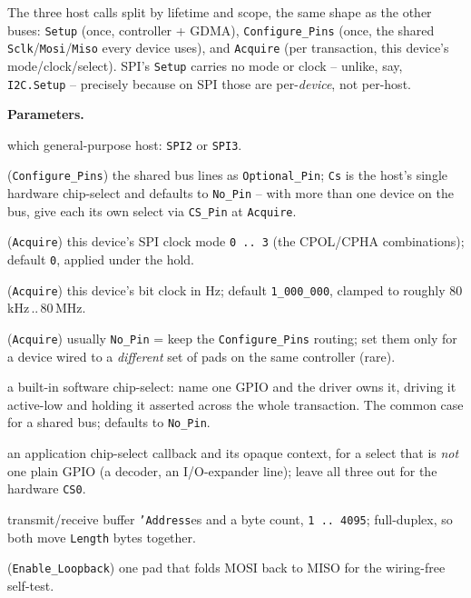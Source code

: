 The three host calls split by lifetime and scope, the same shape as the other
buses: \texttt{Setup} (once, controller + GDMA), \texttt{Configure\_Pins} (once,
the shared \texttt{Sclk}/\texttt{Mosi}/\texttt{Miso} every device uses), and
\texttt{Acquire} (per transaction, this device's mode/clock/select). SPI's
\texttt{Setup} carries no mode or clock -- unlike, say, \texttt{I2C.Setup} --
precisely because on SPI those are per-\emph{device}, not per-host.

\textbf{Parameters.}
\begin{description}[style=nextline]
\item[\texttt{Host}] which general-purpose host: \texttt{SPI2} or \texttt{SPI3}.
\item[\texttt{Sclk}, \texttt{Mosi}, \texttt{Miso}, \texttt{Cs}] (\texttt{Configure\_Pins})
  the shared bus lines as \texttt{Optional\_Pin}; \texttt{Cs} is the host's single
  hardware chip-select and defaults to \texttt{No\_Pin} -- with more than one device
  on the bus, give each its own select via \texttt{CS\_Pin} at \texttt{Acquire}.
\item[\texttt{Mode}] (\texttt{Acquire}) this device's SPI clock mode \texttt{0\,..\,3}
  (the CPOL/CPHA combinations); default \texttt{0}, applied under the hold.
\item[\texttt{Clock\_Hz}] (\texttt{Acquire}) this device's bit clock in Hz; default
  \texttt{1\_000\_000}, clamped to roughly 80\,kHz\,..\,80\,MHz.
\item[\texttt{Sclk}, \texttt{Mosi}, \texttt{Miso}] (\texttt{Acquire}) usually
  \texttt{No\_Pin} = keep the \texttt{Configure\_Pins} routing; set them only for a
  device wired to a \emph{different} set of pads on the same controller (rare).
\item[\texttt{CS\_Pin}] a built-in software chip-select: name one GPIO and the
  driver owns it, driving it active-low and holding it asserted across the whole
  transaction. The common case for a shared bus; defaults to \texttt{No\_Pin}.
\item[\texttt{Select\_CB}, \texttt{Ctx}] an application chip-select callback and its
  opaque context, for a select that is \emph{not} one plain GPIO (a decoder, an
  I/O-expander line); leave all three out for the hardware \texttt{CS0}.
\item[\texttt{Tx}, \texttt{Rx}, \texttt{Length}] transmit/receive buffer
  \texttt{'Address}es and a byte count, \texttt{1\,..\,4095}; full-duplex, so both
  move \texttt{Length} bytes together.
\item[\texttt{Pad}] (\texttt{Enable\_Loopback}) one pad that folds MOSI back to MISO
  for the wiring-free self-test.
\end{description}


